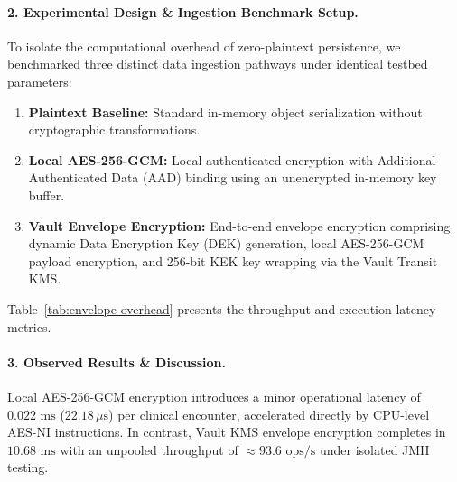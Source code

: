 \paragraph{2. Experimental Design \& Ingestion Benchmark Setup.}
To isolate the computational overhead of zero-plaintext persistence, we benchmarked three distinct data ingestion pathways under identical testbed parameters:
\begin{enumerate}
    \item \textbf{Plaintext Baseline:} Standard in-memory object serialization without cryptographic transformations.
    \item \textbf{Local AES-256-GCM:} Local authenticated encryption with Additional Authenticated Data (AAD) binding using an unencrypted in-memory key buffer.
    \item \textbf{Vault Envelope Encryption:} End-to-end envelope encryption comprising dynamic Data Encryption Key (DEK) generation, local AES-256-GCM payload encryption, and 256-bit KEK key wrapping via the Vault Transit KMS.
\end{enumerate}

Table~\ref{tab:envelope-overhead} presents the throughput and execution latency metrics.

\begin{table}[H]
  \centering
  \caption{Computational Overhead of Zero-Plaintext Envelope Encryption.}
  \label{tab:envelope-overhead}
\end{table}

\paragraph{3. Observed Results \& Discussion.}
Local AES-256-GCM encryption introduces a minor operational latency of $0.022\text{~ms}$ ($22.18\,\mu\text{s}$) per clinical encounter, accelerated directly by CPU-level AES-NI instructions. In contrast, Vault KMS envelope encryption completes in $10.68\text{~ms}$ with an unpooled throughput of $\approx 93.6\text{~ops/s}$ under isolated JMH testing.

